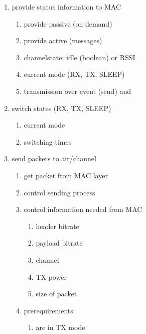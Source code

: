 \begin{enumerate}
 \item provide status information to MAC
	\begin{enumerate}
	\item provide passive (on demand) \label{provpassive}
	\item provide active (messages) \label{provactive}
	\item channelstate: idle (boolean) or RSSI \label{channelstate}
	\item current mode (RX, TX, SLEEP) \label{currentmode}
	\item transmission over event (send)  and \label{txover}
	\end{enumerate}
 \item switch states (RX, TX, SLEEP)
	\begin{enumerate}
	\item current mode \label{switchmode}
	\item switching times \label{switchtimes}
	\end{enumerate}
 \item send packets to air/channel
	\begin{enumerate}
	\item get packet from MAC layer \label{packetFromMac}
	\item control sending process \label{sendControl}
	\item control information needed from MAC
		\begin{enumerate}
		\item header bitrate \label{sendCtrlHeaderBitrate}
		\item payload bitrate \label{sendCtrlBitrate}
		\item channel \label{sendCtrlChannel}
		\item TX power \label{sendCtrlTXPower}
		\item size of packet \label{sendCtrlSize}
		\end{enumerate}
	\item prerequirements
		\begin{enumerate}
		\item are in TX mode \label{sendPreqMode}

\end{enumerate}
\end{enumerate}
\end{enumerate}
